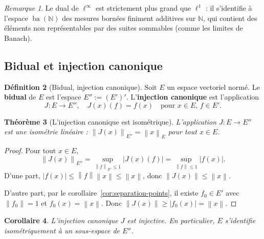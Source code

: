 \documentclass[a4paper,12pt]{book}
\newcommand{\N}{\mathbb{N}}
\newcommand{\norm}[1]{\left\| #1 \right\|}
\newcommand{\abs}[1]{\left| #1 \right|}
\theoremstyle{definition}
\newtheorem{definition}{Définition}[chapter]
\theoremstyle{plain}
\newtheorem{theoreme}[definition]{Théorème}
\newtheorem{corollaire}[definition]{Corollaire}
\theoremstyle{remark}
\newtheorem{remarque}[definition]{Remarque}
\begin{document}
\begin{remarque}\label{rem:dual-l-infty}
Le dual de $\ell^\infty$ est strictement plus grand que $\ell^1$ : il s'identifie à
l'espace $\operatorname{ba}(\N)$\index{ba(N)@$\operatorname{ba}(\N)$} des mesures
bornées finiment additives sur $\N$, qui contient des éléments non représentables par
des suites sommables (comme les limites de Banach).
\end{remarque}

\subsection{Bidual et injection canonique}


\begin{definition}[Bidual, injection canonique]\label{def:bidual}
Soit $E$ un espace vectoriel normé. Le \textbf{bidual} de $E$ est l'espace
$E'' := (E')'$. L'\textbf{injection canonique} est l'application
\[
    J : E \to E'', \quad J(x)(f) = f(x) \quad \text{pour } x \in E,\, f \in E'.
\]
\end{definition}

\begin{theoreme}[L'injection canonique est isométrique]\label{thm:J-isometrique}
L'application $J : E \to E''$ est une isométrie linéaire : $\norm{J(x)}_{E''} = \norm{x}_E$
pour tout $x \in E$.
\end{theoreme}

\begin{proof}
Pour tout $x \in E$,
\[
    \norm{J(x)}_{E''} = \sup_{\norm{f}_{E'} \leq 1} \abs{J(x)(f)}
    = \sup_{\norm{f} \leq 1} \abs{f(x)}.
\]
D'une part, $\abs{f(x)} \leq \norm{f}\norm{x} \leq \norm{x}$, donc
$\norm{J(x)} \leq \norm{x}$.

D'autre part, par le corollaire~\ref{cor:separation-points}, il existe $f_0 \in E'$
avec $\norm{f_0} = 1$ et $f_0(x) = \norm{x}$. Donc
$\norm{J(x)} \geq \abs{f_0(x)} = \norm{x}$.
\end{proof}

\begin{corollaire}\label{cor:J-injectif}
L'injection canonique $J$ est injective. En particulier, $E$ s'identifie
isométriquement à un sous-espace de $E''$.
\end{corollaire}
\end{document}
